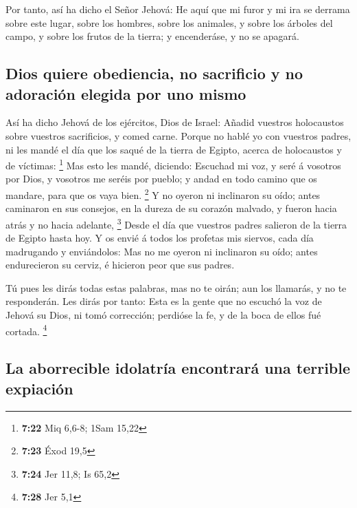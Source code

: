  Por tanto, así ha dicho el Señor Jehová: He aquí que mi
furor y mi ira se derrama sobre este lugar, sobre los hombres, sobre los
animales, y sobre los árboles del campo, y sobre los frutos de la
tierra; y encenderáse, y no se apagará.

\hypertarget{dios-quiere-obediencia-no-sacrificio-y-no-adoraciuxf3n-elegida-por-uno-mismo}{%
\subsection{Dios quiere obediencia, no sacrificio y no adoración elegida
por uno
mismo}\label{dios-quiere-obediencia-no-sacrificio-y-no-adoraciuxf3n-elegida-por-uno-mismo}}

 Así ha dicho Jehová de los ejércitos, Dios de Israel:
Añadid vuestros holocaustos sobre vuestros sacrificios, y comed carne.
 Porque no hablé yo con vuestros padres, ni les mandé el
día que los saqué de la tierra de Egipto, acerca de holocaustos y de
víctimas: \footnote{\textbf{7:22} Miq 6,6-8; 1Sam 15,22} 
Mas esto les mandé, diciendo: Escuchad mi voz, y seré á vosotros por
Dios, y vosotros me seréis por pueblo; y andad en todo camino que os
mandare, para que os vaya bien. \footnote{\textbf{7:23} Éxod 19,5}
 Y no oyeron ni inclinaron su oído; antes caminaron en
sus consejos, en la dureza de su corazón malvado, y fueron hacia atrás y
no hacia adelante, \footnote{\textbf{7:24} Jer 11,8; Is 65,2}
 Desde el día que vuestros padres salieron de la tierra
de Egipto hasta hoy. Y os envié á todos los profetas mis siervos, cada
día madrugando y enviándolos:  Mas no me oyeron ni
inclinaron su oído; antes endurecieron su cerviz, é hicieron peor que
sus padres.

 Tú pues les dirás todas estas palabras, mas no te oirán;
aun los llamarás, y no te responderán.  Les dirás por
tanto: Esta es la gente que no escuchó la voz de Jehová su Dios, ni tomó
corrección; perdióse la fe, y de la boca de ellos fué cortada.
\footnote{\textbf{7:28} Jer 5,1}

\hypertarget{la-aborrecible-idolatruxeda-encontraruxe1-una-terrible-expiaciuxf3n}{%
\subsection{La aborrecible idolatría encontrará una terrible
expiación}\label{la-aborrecible-idolatruxeda-encontraruxe1-una-terrible-expiaciuxf3n}}

